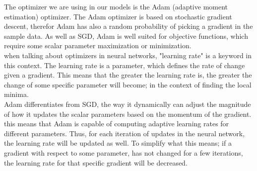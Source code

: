 The optimizer we are using in our models is the Adam (adaptive moment estimation)  optimizer. The Adam optimizer is based on stochastic gradient descent\cite{adam}, therefor Adam has also a random probability of picking a gradient in the sample data. As well as SGD, Adam is well suited for objective functions, which require some scalar parameter maximization or minimization. \\

\noindent
when talking about optimizers in neural networks, "learning rate" is a keyword in this context. The learning rate is a parameter, which defines the rate of change given a gradient. This means that the greater the learning rate is, the greater the change of some specific parameter will become; in the context of finding the local minima.\\

\noindent
Adam differentiates from SGD, the way it dynamically can adjust the magnitude of how it updates the scalar parameters based on the momentum of the gradient. this means that Adam is capable of computing adaptive learning rates for different parameters\cite{adam}. Thus, for each iteration of updates in the neural network, the learning rate will be updated as well. To simplify what this means; if a gradient with respect to some parameter, has not changed for a few iterations, the learning rate for that specific gradient will be decreased.